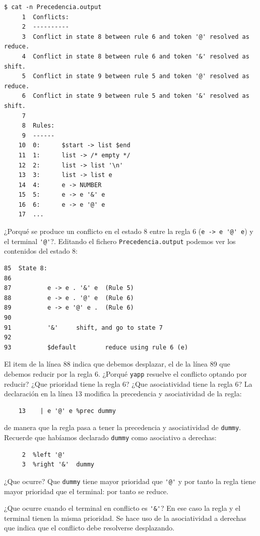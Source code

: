 \begin{verbatim}
$ cat -n Precedencia.output
     1  Conflicts:
     2  ----------
     3  Conflict in state 8 between rule 6 and token '@' resolved as reduce.
     4  Conflict in state 8 between rule 6 and token '&' resolved as shift.
     5  Conflict in state 9 between rule 5 and token '@' resolved as reduce.
     6  Conflict in state 9 between rule 5 and token '&' resolved as shift.
     7
     8  Rules:
     9  ------
    10  0:      $start -> list $end
    11  1:      list -> /* empty */
    12  2:      list -> list '\n'
    13  3:      list -> list e
    14  4:      e -> NUMBER
    15  5:      e -> e '&' e
    16  6:      e -> e '@' e
    17  ...
\end{verbatim}
¿Porqué se produce un conflicto en el estado 8 entre la regla
6 (\verb|e -> e '@' e|) y el terminal \verb|'@'|?. Editando el fichero
\verb|Precedencia.output| podemos ver los contenidos
del estado 8:
\begin{verbatim}
85  State 8:
86
87          e -> e . '&' e  (Rule 5)
88          e -> e . '@' e  (Rule 6)
89          e -> e '@' e .  (Rule 6)
90
91          '&'     shift, and go to state 7
92
93          $default        reduce using rule 6 (e)
\end{verbatim}
El item de la línea 88 indica que debemos desplazar, el de 
la línea 89 que debemos reducir por la regla 6. ¿Porqué \verb|yapp|
resuelve el conflicto optando por reducir?
¿Que prioridad tiene la regla 6?
¿Que asociatividad tiene la regla 6?
La declaración en la línea 13 modifica la precedencia y asociatividad
de la regla:

\begin{verbatim}
    13    | e '@' e %prec dummy
\end{verbatim}

de manera que la regla pasa a tener la precedencia y asociatividad
de \verb|dummy|. Recuerde que habíamos declarado \verb|dummy| como
asociativo a derechas:
\begin{verbatim}
     2  %left '@'
     3  %right '&'  dummy
\end{verbatim}
¿Que ocurre? Que \verb|dummy| tiene mayor prioridad
que \verb|'@'| y por tanto la regla tiene mayor prioridad
que el terminal: por tanto se reduce.

¿Que ocurre cuando el terminal en conflicto es \verb|'&'|?
En ese caso la regla y el terminal tienen la misma prioridad.
Se hace uso de la asociatividad a derechas que indica que el conflicto
debe resolverse desplazando.

